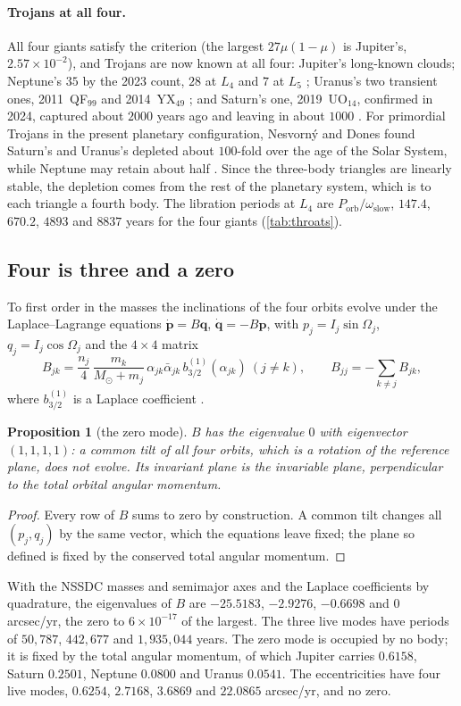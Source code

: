 \documentclass[11pt]{article}
\newtheorem{proposition}[theorem]{Proposition}
\theoremstyle{definition}\newtheorem{definition}[theorem]{Definition}
\theoremstyle{remark}\newtheorem{remark}[theorem]{Remark}
\begin{document}
\paragraph{Trojans at all four.} All four giants satisfy the criterion (the largest $27\mu(1-\mu)$ is Jupiter's, $2.57\times10^{-2}$), and Trojans are now known at all four: Jupiter's long-known clouds; Neptune's $35$ by the 2023 count, $28$ at $L_4$ and $7$ at $L_5$ \cite{WikiMoons}; Uranus's two transient ones, 2011~QF$_{99}$ and 2014~YX$_{49}$ \cite{dlFM}; and Saturn's one, 2019~UO$_{14}$, confirmed in 2024, captured about $2000$ years ago and leaving in about $1000$ \cite{HuiTrojan}. For primordial Trojans in the present planetary configuration, Nesvorn\'y and Dones found Saturn's and Uranus's depleted about $100$-fold over the age of the Solar System, while Neptune may retain about half \cite{NesvornyDones}. Since the three-body triangles are linearly stable, the depletion comes from the rest of the planetary system, which is to each triangle a fourth body. The libration periods at $L_4$ are $P_\mathrm{orb}/\omega_\mathrm{slow}$, $147.4$, $670.2$, $4893$ and $8837$ years for the four giants (\cref{tab:throats}).

\subsection{Four is three and a zero}\label{sec:zeromode}
To first order in the masses the inclinations of the four orbits evolve under the Laplace--Lagrange equations $\dot{\mathbf p}=B\mathbf q$, $\dot{\mathbf q}=-B\mathbf p$, with $p_j=I_j\sin\Omega_j$, $q_j=I_j\cos\Omega_j$ and the $4\times4$ matrix
\[
B_{jk}=\frac{n_j}4\,\frac{m_k}{M_\odot+m_j}\,\alpha_{jk}\bar\alpha_{jk}\,b^{(1)}_{3/2}(\alpha_{jk})\ (j\ne k),\qquad B_{jj}=-\sum_{k\ne j}B_{jk},
\]
where $b^{(1)}_{3/2}$ is a Laplace coefficient \cite{MD}.
\begin{proposition}[the zero mode]\label{prop:zeromode}
$B$ has the eigenvalue $0$ with eigenvector $(1,1,1,1)$: a common tilt of all four orbits, which is a rotation of the reference plane, does not evolve. Its invariant plane is the invariable plane, perpendicular to the total orbital angular momentum.
\end{proposition}
\begin{proof}
Every row of $B$ sums to zero by construction. A common tilt changes all $(p_j,q_j)$ by the same vector, which the equations leave fixed; the plane so defined is fixed by the conserved total angular momentum.
\end{proof}
With the NSSDC masses and semimajor axes and the Laplace coefficients by quadrature, the eigenvalues of $B$ are $-25.5183$, $-2.9276$, $-0.6698$ and $0$ arcsec/yr, the zero to $6\times10^{-17}$ of the largest. The three live modes have periods of $50{,}787$, $442{,}677$ and $1{,}935{,}044$ years. The zero mode is occupied by no body; it is fixed by the total angular momentum, of which Jupiter carries $0.6158$, Saturn $0.2501$, Neptune $0.0800$ and Uranus $0.0541$. The eccentricities have four live modes, $0.6254$, $2.7168$, $3.6869$ and $22.0865$ arcsec/yr, and no zero.
\end{document}
